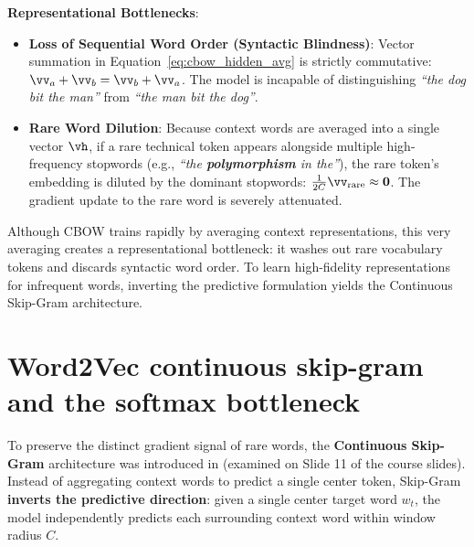 \documentclass[../../main.tex]{subfiles}
\begin{document}
\noindent\textbf{Representational Bottlenecks}:
\begin{itemize}
    \item \textbf{Loss of Sequential Word Order (Syntactic Blindness)}: Vector summation in Equation~\eqref{eq:cbow_hidden_avg} is strictly commutative: $\vv_a + \vv_b = \vv_b + \vv_a$. The model is incapable of distinguishing \emph{``the dog bit the man''} from \emph{``the man bit the dog''}.
    \item \textbf{Rare Word Dilution}: Because context words are averaged into a single vector $\vh$, if a rare technical token appears alongside multiple high-frequency stopwords (e.g., \emph{``the \textbf{polymorphism} in the''}), the rare token's embedding is diluted by the dominant stopwords: $\frac{1}{2C} \vv_{\text{rare}} \approx \mathbf{0}$. The gradient update to the rare word is severely attenuated.
\end{itemize}

Although CBOW trains rapidly by averaging context representations, this very averaging creates a representational bottleneck: it washes out rare vocabulary tokens and discards syntactic word order. To learn high-fidelity representations for infrequent words, inverting the predictive formulation yields the Continuous Skip-Gram architecture.

\section{Word2Vec continuous skip-gram and the softmax bottleneck}
\label{sec:skipgram_architecture}

To preserve the distinct gradient signal of rare words, the \textbf{Continuous Skip-Gram} architecture was introduced in \cite{mikolov2013efficient} (examined on Slide 11 of the course slides). Instead of aggregating context words to predict a single center token, Skip-Gram \textbf{inverts the predictive direction}: given a single center target word $w_t$, the model independently predicts each surrounding context word within window radius $C$.
\end{document}
